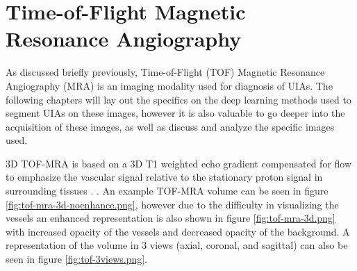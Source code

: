\chapter{Time-of-Flight Magnetic Resonance Angiography}
\label{chapter3}

As discussed briefly previously, Time-of-Flight (TOF) Magnetic Resonance Angiography (MRA) is an imaging modality used for diagnosis of UIAs. The following chapters will lay out the specifics on the deep learning methods used to segment UIAs on these images, however it is also valuable to go deeper into the acquisition of these images, as well as discuss and analyze the specific images used.

3D TOF-MRA is based on a 3D T1 weighted echo gradient compensated for flow to emphasize the vascular signal relative to the stationary proton signal in surrounding tissues \cite{Rodriguez-Regent2014}.   . An example TOF-MRA volume can be seen in figure \ref{fig:tof-mra-3d-noenhance.png}, however due to the difficulty in visualizing the vessels an enhanced representation is also shown in figure \ref{fig:tof-mra-3d.png} with increased opacity of the vessels and decreased opacity of the background. A representation of the volume in 3 views (axial, coronal, and sagittal) can also be seen in figure \ref{fig:tof-3views.png}.

